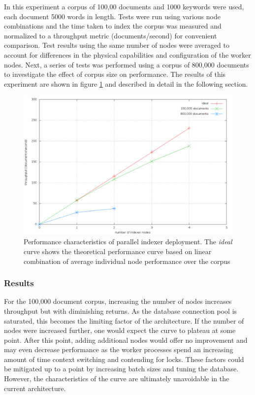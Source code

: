\documentclass[10pt]{report}
\begin{document}
In this experiment a corpus of 100,00 documents and 1000 keywords were
used, each document 5000 words in length. Tests were run using various
node combinations and the time taken to index the corpus was measured and
normalized to a throughput metric (documents/second) for convenient
comparison. Test results using the same number of nodes were averaged
to account for differences in the physical capabilities and
configuration of the worker nodes. Next, a series of tests was
performed using a corpus of 800,000 documents to investigate the
effect of corpus size on performance. The results of this experiment
are shown in figure \ref{fig:parallelization} and described in detail
in the following section.

\begin{figure}[h]
  \begin{center}
    \includegraphics[width=\textwidth,height=!]{parallelization}
  \end{center}
  \caption{Performance characteristics of parallel indexer
    deployment. The \textit{ideal} curve shows the theoretical
    performance curve based on linear combination of average
    individual node performance over the corpus} 
  \label{fig:parallelization}
\end{figure} 

\subsubsection{Results}
For the 100,000 document corpus, increasing the number of nodes
increases throughput but with diminishing returns. As the database
connection pool is saturated, this becomes the limiting factor of the
architecture. If the number of nodes were increased further, one would
expect the curve to plateau at some point. After this point, adding
additional nodes would offer no improvement and may even decrease
performance as the worker processes spend an increasing amount of time
context switching and contending for locks. These factors could be
mitigated up to a point by increasing batch sizes and tuning the
database. However, the characteristics of the curve are ultimately
unavoidable in the current architecture. 
\end{document}
